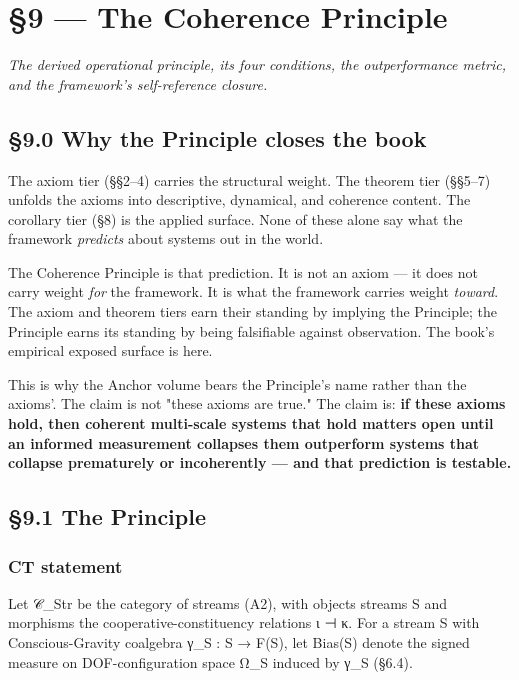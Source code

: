 \documentclass[11pt, openany]{book}
\newcommand{\sectionbreak}{\clearpage}
\begin{document}
\chapter{§9 — The Coherence Principle}


\textit{The derived operational principle, its four conditions, the outperformance metric, and the framework's self-reference closure.}

\sectionbreak

\section{§9.0 Why the Principle closes the book}

The axiom tier (§§2–4) carries the structural weight. The theorem tier (§§5–7) unfolds the axioms into descriptive, dynamical, and coherence content. The corollary tier (§8) is the applied surface. None of these alone say what the framework \textit{predicts} about systems out in the world.

The Coherence Principle is that prediction. It is not an axiom --- it does not carry weight \textit{for} the framework. It is what the framework carries weight \textit{toward}. The axiom and theorem tiers earn their standing by implying the Principle; the Principle earns its standing by being falsifiable against observation. The book's empirical exposed surface is here.

This is why the Anchor volume bears the Principle's name rather than the axioms'. The claim is not "these axioms are true." The claim is: \textbf{if these axioms hold, then coherent multi-scale systems that hold matters open until an informed measurement collapses them outperform systems that collapse prematurely or incoherently --- and that prediction is testable.}

\sectionbreak

\section{§9.1 The Principle}

\subsection{CT statement}

Let 𝒞\_\allowbreak{}Str be the category of streams (A2), with objects streams S and morphisms the cooperative-constituency relations ι ⊣ κ. For a stream S with Conscious-Gravity coalgebra γ\_\allowbreak{}S : S → F(S), let Bias(S) denote the signed measure on DOF-configuration space Ω\_\allowbreak{}S induced by γ\_\allowbreak{}S (§6.4).
\end{document}
